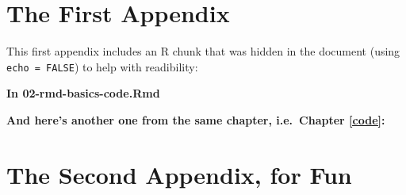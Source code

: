 \documentclass[a4paper, nobind]{templates/ociamthesis}
\newcommand*{\bibtitle}{References}
\begin{document}
\startappendices

\hypertarget{the-first-appendix}{%
\chapter{The First Appendix}\label{the-first-appendix}}

This first appendix includes an R chunk that was hidden in the document (using \texttt{echo\ =\ FALSE}) to help with readibility:

\textbf{In 02-rmd-basics-code.Rmd}

\textbf{And here's another one from the same chapter, i.e.~Chapter \ref{code}:}

\hypertarget{the-second-appendix-for-fun}{%
\chapter{The Second Appendix, for Fun}\label{the-second-appendix-for-fun}}




\setlength{\baselineskip}{0pt} %

{\renewcommand*\MakeUppercase[1]{#1}%
\printbibliography[heading=bibintoc,title={\bibtitle}]}
\end{document}
